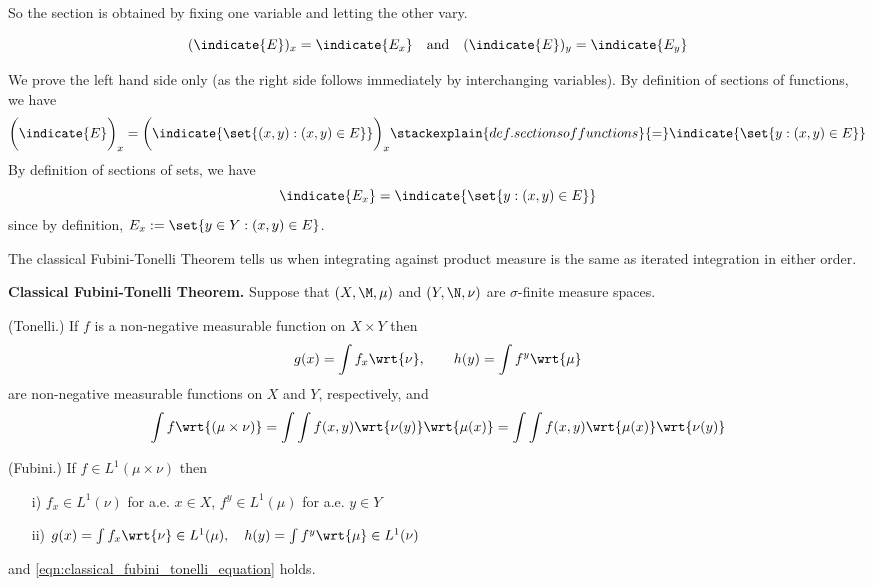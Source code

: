 \documentclass{article} %
\begin{document}
So the section is obtained by fixing one variable and letting the other vary. 

\begin{example}
\[ (\indicate{E})_x =  \indicate{{E_x}} \quad \text{and} \quad (\indicate{E})_y =  \indicate{{E_y}}  \]

{\tiny We prove the left hand side only (as the right side follows immediately by interchanging variables). By definition of sections of functions, we have
\[\bigg(\indicate{E}\bigg)_x = \bigg(\indicate{ \set{(x,y) : (x,y) \in E}}\bigg)_x \stackexplain{def. sections of functions}{=} \indicate{\set{y: (x,y) \in E}}\] 
By definition of sections of sets, we have
\[ \indicate{{E_x}} = \indicate{\set{y: (x,y) \in E}} \]
since by definition, $E_x := \set{y \in Y : (x,y) \in E}$. 
}
\end{example}


The classical Fubini-Tonelli Theorem tells us when integrating against product measure is the same as iterated integration in either order. 

\begin{theorem}\textbf{Classical Fubini-Tonelli Theorem.}   Suppose that $(X,\M,\mu)$ and $(Y, \N, \nu)$ are $\sigma$-finite measure spaces.  
\begin{alphabate}
\item (Tonelli.) If $f$ is a non-negative measurable function on $X \times Y$ then
\[ g(x) = \int f_x \wrt{\nu}, \quad \quad h(y) = \int f^y \wrt{\mu} \]
are non-negative measurable functions on $X$ and $Y$, respectively, and 
\begin{align}
\int f \wrt{(\mu \times \nu)} = \int \int f(x,y) \wrt{\nu(y)}   \wrt{\mu(x)}  = \int \int f(x,y) \wrt{\mu(x)}  \wrt{\nu(y)}   
\label{eqn:classical_fubini_tonelli_equation}
\end{align}
\item (Fubini.) If $f \in L^1(\mu \times \nu)$ then 
	\begin{enumerate}
		\item[i)] $f_x \in L^1(\nu)$ for a.e. $x \in X$, \quad $f^y \in L^1(\mu)$ for a.e. $y \in Y$
		\item[ii)] $g(x) = \int f_x \wrt{\nu} \in L^1(\mu),  \quad h(y) = \int f^y \wrt{\mu} \in L^1(\nu)$
	\end{enumerate}
and \eqref{eqn:classical_fubini_tonelli_equation} holds.
\end{alphabate}	
\label{thm:classical_fubini_tonelli}
\end{theorem}
\end{document}
